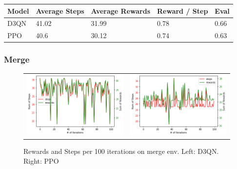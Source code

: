 \documentclass[leqno]{article}
\begin{document}
\begin{multicols}{2}
\begin{tabular}{ |p{1cm}||p{1.5cm}|p{1.5cm}|p{1.2cm}|p{0.8cm}|  }
 \hline
 Model&Average Steps& Average Rewards& Reward / Step&Eval\\
 \hline
 D3QN & 41.02 & 31.99 & 0.78 & 0.66\\
 PPO & 40.6 & 30.12 & 0.74 & 0.63\\
 \hline
\end{tabular}

\subsubsection{Merge}

\begin{figure}[H]
  \begin{tabular}{ll}
    \includegraphics[scale=0.25]{figs/d3qn_ex3_merge.png}&
    \includegraphics[scale=0.25]{figs/ppo_ex3_merge.png}\\
  \end{tabular}
  \caption{Rewards and Steps per 100 iterations on merge env. Left: D3QN. Right: PPO}
  \label{hyperparams}
\end{figure}


\end{multicols}
\end{document}
